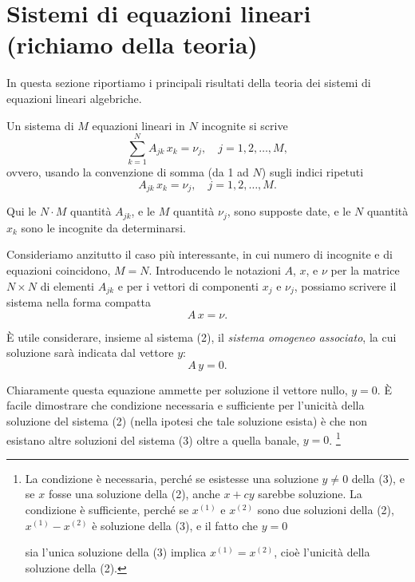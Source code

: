\documentclass[11pt, a4paper]{book}
\numberwithin{equation}{section}
\begin{document}


\section{Sistemi di equazioni lineari (richiamo della teoria)}

In questa sezione riportiamo i principali risultati della teoria dei
sistemi di equazioni lineari algebriche.

Un sistema di $M$ equazioni lineari in $N$ incognite si scrive
\begin{equation}
\sum_{k=1}^{N} A_{jk}\, x_k = \nu_j, \quad j = 1, 2, \ldots, M,
\label{eq:3.2.1a}
\end{equation}
ovvero, usando la convenzione di somma (da 1 ad $N$) sugli indici ripetuti
\begin{equation}
A_{jk}\, x_k = \nu_j, \quad j = 1, 2, \ldots, M.
\label{eq:3.2.1b}
\end{equation}

Qui le $N \cdot M$ quantità $A_{jk}$, e le $M$ quantità $\nu_j$, sono
supposte date, e le $N$ quantità $x_k$ sono le incognite da determinarsi.

Consideriamo anzitutto il caso più interessante, in cui numero di incognite
e di equazioni coincidono, $M = N$. Introducendo le notazioni $A$, $x$, e
$\nu$ per la matrice $N\times N$ di elementi $A_{jk}$ e per i vettori di
componenti $x_j$ e $\nu_j$, possiamo scrivere il sistema nella forma
compatta
\begin{equation}
A\, x = \nu.
\end{equation}

È utile considerare, insieme al sistema (2), il \emph{sistema omogeneo
associato}, la cui soluzione sarà indicata dal vettore $y$:
\begin{equation}
A\, y = 0.
\end{equation}

Chiaramente questa equazione ammette per soluzione il vettore nullo, $y =
0$. È facile dimostrare che condizione necessaria e sufficiente per
l'unicità della soluzione del sistema (2) (nella ipotesi che tale soluzione
esista) è che non esistano altre soluzioni del sistema (3) oltre a quella
banale, $y = 0$.%
\footnote{La condizione è necessaria, perché se esistesse una soluzione $y
\neq 0$ della (3), e se $x$ fosse una soluzione della (2), anche $x + cy$
sarebbe soluzione. La condizione è sufficiente, perché se $x^{(1)}$ e
$x^{(2)}$ sono due soluzioni della (2), $x^{(1)} - x^{(2)}$ è soluzione
della (3), e il fatto che $y = 0$


sia l'unica soluzione della (3) implica $x^{(1)} = x^{(2)}$, cioè
l'unicità della soluzione della (2).}
\end{document}
